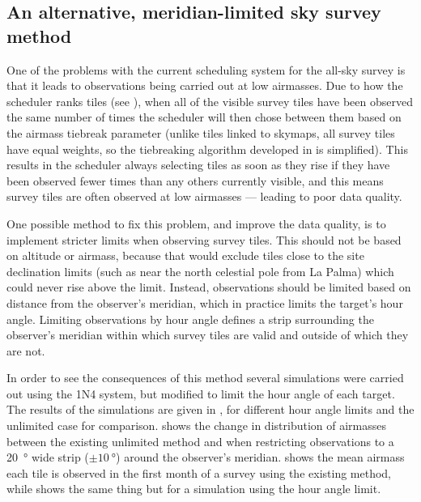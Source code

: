 \subsection{An alternative, meridian-limited sky survey method}
\label{sec:survey_sim_meridian}
\begin{colsection}

One of the problems with the current scheduling system for the all-sky survey is that it leads to observations being carried out at low airmasses. Due to how the scheduler ranks tiles (see ), when all of the visible survey tiles have been observed the same number of times the scheduler will then chose between them based on the airmass tiebreak parameter (unlike tiles linked to skymaps, all survey tiles have equal weights, so the tiebreaking algorithm developed in  is simplified). This results in the scheduler always selecting tiles as soon as they rise if they have been observed fewer times than any others currently visible, and this means survey tiles are often observed at low airmasses --- leading to poor data quality.

One possible method to fix this problem, and improve the data quality, is to implement stricter limits when observing survey tiles. This should not be based on altitude or airmass, because that would exclude tiles close to the site declination limits (such as near the north celestial pole from La Palma) which could never rise above the limit. Instead, observations should be limited based on distance from the observer's meridian, which in practice limits the target's hour angle. Limiting observations by hour angle defines a strip surrounding the observer's meridian within which survey tiles are valid and outside of which they are not.

In order to see the consequences of this method several simulations were carried out using the 1N4 system, but modified to limit the hour angle of each target. The results of the simulations are given in , for different hour angle limits and the unlimited case for comparison.  shows the change in distribution of airmasses between the existing unlimited method and when restricting observations to a \SI{20}{\degree} wide strip ($\pm\SI{10}{\degree}$) around the observer's meridian.  shows the mean airmass each tile is observed in the first month of a survey using the existing method, while  shows the same thing but for a simulation using the hour angle limit.


\end{colsection}
